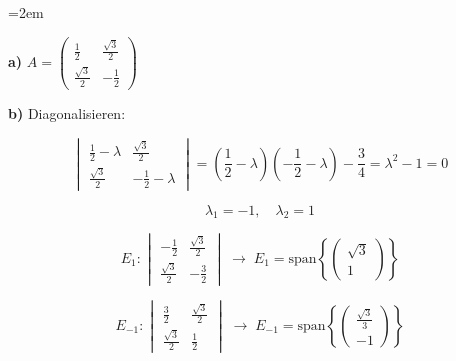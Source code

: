\begin{solution}    

    \vspace{1\baselineskip}

    \leftskip=2em

    \textbf{a)} \( A = \begin{pmatrix} \frac{1}{2} & \frac{\sqrt{3}}{2} \\ \frac{\sqrt{3}}{2} & -\frac{1}{2} \end{pmatrix} \)

    \vspace{1\baselineskip}

    \textbf{b)} Diagonalisieren:

    \begin{equation*}
        \begin{vmatrix}
            \frac{1}{2} - \lambda & \frac{\sqrt{3}}{2} \\
            \frac{\sqrt{3}}{2} & -\frac{1}{2} - \lambda
        \end{vmatrix} = \left(\frac{1}{2} - \lambda\right)\left(-\frac{1}{2} - \lambda\right) - \frac{3}{4} = \lambda^2 - 1 = 0 
    \end{equation*}

    \begin{equation*}
        \lambda_1 = -1, \quad \lambda_2 = 1
    \end{equation*}

    \begin{equation*}
        E_1: \begin{vmatrix}
            - \frac{1}{2} & \frac{\sqrt{3}}{2} \\
            \frac{\sqrt{3}}{2} & -\frac{3}{2}
        \end{vmatrix} \; \rightarrow \; E_1 = \text{span} \left\{ \begin{pmatrix}
            \sqrt{3} \\ 1
        \end{pmatrix} \right\}
    \end{equation*}

    \begin{equation*}
        E_{-1}: \begin{vmatrix}
            \frac{3}{2} & \frac{\sqrt{3}}{2} \\
            \frac{\sqrt{3}}{2} & \frac{1}{2}
        \end{vmatrix} \; \rightarrow \; E_{-1} = \text{span} \left\{ \begin{pmatrix}
            \frac{\sqrt{3}}{3} \\ -1
        \end{pmatrix} \right\}
    \end{equation*}


\end{solution}
